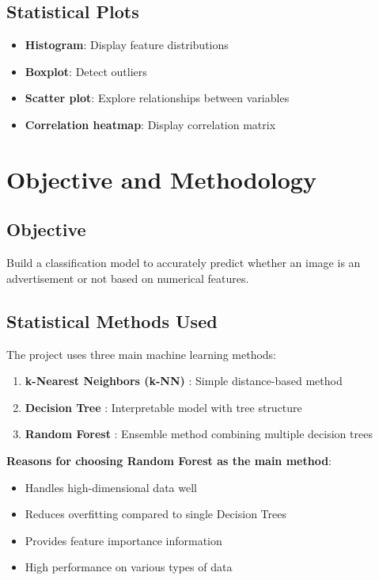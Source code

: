 \documentclass[twoside,final]{hcmut-report}
\begin{document}
\subsection{Statistical Plots}
\begin{itemize}
  \item \textbf{Histogram}: Display feature distributions
  \item \textbf{Boxplot}: Detect outliers
  \item \textbf{Scatter plot}: Explore relationships between variables
  \item \textbf{Correlation heatmap}: Display correlation matrix
\end{itemize}

\section{Objective and Methodology}
\label{sec:objective-methodology}

\subsection{Objective}
Build a classification model to accurately predict whether an image is an advertisement or not based on numerical features.

\subsection{Statistical Methods Used}
The project uses three main machine learning methods:

\begin{enumerate}
  \item \textbf{k-Nearest Neighbors (k-NN)} \cite{cover1967nearest}: Simple distance-based method
  \item \textbf{Decision Tree} \cite{quinlan1993c4}: Interpretable model with tree structure
  \item \textbf{Random Forest} \cite{breiman2001random}: Ensemble method combining multiple decision trees
\end{enumerate}

\textbf{Reasons for choosing Random Forest as the main method}:
\begin{itemize}
  \item Handles high-dimensional data well
  \item Reduces overfitting compared to single Decision Trees
  \item Provides feature importance information
  \item High performance on various types of data
\end{itemize}
\end{document}
